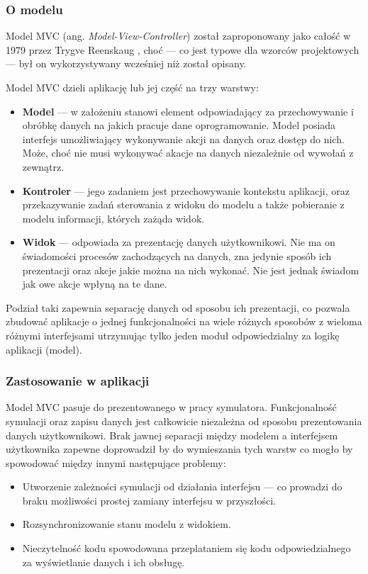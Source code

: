 {\subsubsection{O modelu}
\par{
Model MVC (ang. \textit{Model-View-Controller}) został zaproponowany jako całość w 1979 przez Trygve Reenskaug \cite{MVC}, choć --- co jest typowe dla wzorców projektowych --- był on wykorzystywany wcześniej niż został opisany. 
}
\par{
Model MVC dzieli aplikację lub jej część na trzy warstwy:
\begin{itemize}
\item \textbf{Model} --- w założeniu stanowi element odpowiadający za przechowywanie i obróbkę danych na jakich pracuje dane oprogramowanie. Model posiada interfejs umożliwiający wykonywanie akcji na danych oraz dostęp do nich. Może, choć nie musi wykonywać akacje na danych niezależnie od wywołań z zewnątrz.
\item \textbf{Kontroler} --- jego zadaniem jest przechowywanie kontekstu aplikacji, oraz przekazywanie zadań sterowania z widoku do modelu a także pobieranie z modelu informacji, których zażąda widok.
\item \textbf{Widok} --- odpowiada za prezentację danych użytkownikowi. Nie ma on świadomości procesów zachodzących na danych, zna jedynie sposób ich prezentacji oraz akcje jakie można na nich wykonać. Nie jest jednak świadom jak owe akcje wpłyną na te dane.
\end{itemize}
}
\par{
Podział taki zapewnia separację danych od sposobu ich prezentacji, co pozwala zbudować aplikacje o jednej funkcjonalności na wiele różnych sposobów z wieloma różnymi interfejsami utrzymując tylko jeden moduł odpowiedzialny za logikę aplikacji (model).
}
\subsubsection{Zastosowanie w aplikacji}
\par{
Model MVC pasuje do prezentowanego w pracy symulatora. Funkcjonalność symulacji oraz zapisu danych jest całkowicie niezależna od sposobu prezentowania danych użytkownikowi. Brak jawnej separacji między modelem a interfejsem użytkownika zapewne doprowadził by do wymieszania tych warstw co mogło by spowodować między innymi następujące problemy:
\begin{itemize}
\renewcommand{\labelitemi}{$\bullet$}
\item Utworzenie zależności symulacji od działania interfejsu --- co prowadzi do braku możliwości prostej zamiany interfejsu w przyszłości.
\item Rozsynchronizowanie stanu modelu z widokiem.
\item Nieczytelność kodu spowodowana przeplataniem się kodu odpowiedzialnego za wyświetlanie danych i ich obsługę.
\end{itemize}
}
}
